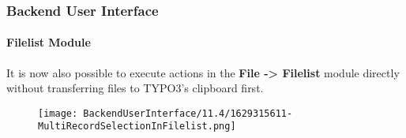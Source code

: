 %

\begin{frame}[fragile]
	\frametitle{Backend User Interface}
	\framesubtitle{Filelist Module}

	It is now also possible to execute actions in the \textbf{File -> Filelist}
	module directly without transferring files to TYPO3's clipboard first.

	\begin{figure}
		\texttt{[image: BackendUserInterface/11.4/1629315611-MultiRecordSelectionInFilelist.png]}
	\end{figure}

\end{frame}

